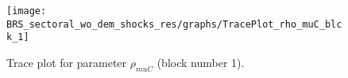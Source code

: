 \begin{figure}[H]
\centering
  \texttt{[image: BRS\_sectoral\_wo\_dem\_shocks\_res/graphs/TracePlot\_rho\_muC\_blck\_1]}\\
    \caption{Trace plot for parameter ${\rho_{muC}}$ (block number 1).}
\end{figure}

